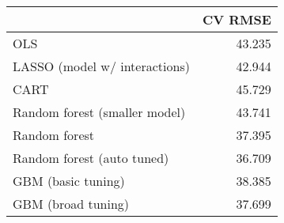 
\begin{tabular}{lr}
\toprule
  & CV RMSE\\
\midrule
OLS & 43.235\\
LASSO (model w/ interactions) & 42.944\\
CART & 45.729\\
Random forest (smaller model) & 43.741\\
Random forest & 37.395\\
Random forest (auto tuned) & 36.709\\
GBM (basic tuning) & 38.385\\
GBM (broad tuning) & 37.699\\
\bottomrule
\end{tabular}